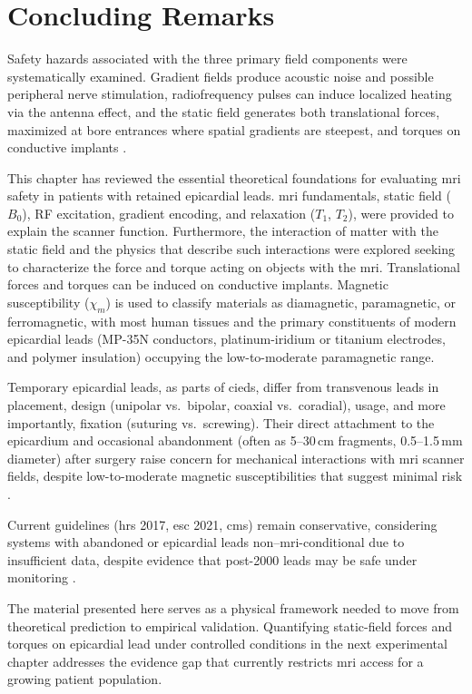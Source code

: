 \section{Concluding Remarks}

Safety hazards associated with the three primary field components were systematically examined. Gradient fields produce acoustic noise and possible peripheral nerve stimulation, radiofrequency pulses can induce localized heating via the antenna effect, and the static field generates both translational forces, maximized at bore entrances where spatial gradients are steepest, and torques on conductive implants \cite{Schenck2000,panych2018}.

This chapter has reviewed the essential theoretical foundations for evaluating \gls{mri} safety in patients with retained epicardial leads. \gls{mri} fundamentals, static field ($B_0$), RF excitation, gradient encoding, and relaxation ($T_1$, $T_2$), were provided to explain the scanner function. Furthermore, the interaction of matter with the static field and the physics that describe such interactions were explored seeking to characterize the force and torque acting on objects with the \gls{mri}. Translational forces and torques can be induced on conductive implants. Magnetic susceptibility ($\chi_m$) is used to classify materials as diamagnetic, paramagnetic, or ferromagnetic, with most human tissues and the primary constituents of modern epicardial leads (MP-35N conductors, platinum-iridium or titanium electrodes, and polymer insulation) occupying the low-to-moderate paramagnetic range.

Temporary epicardial leads, as parts of \glspl{cied}, differ from transvenous leads in placement, design (unipolar vs.\ bipolar, coaxial vs.\ coradial), usage, and more importantly, fixation (suturing vs.\ screwing). Their direct attachment to the epicardium and occasional abandonment (often as 5--30\,cm fragments, 0.5--1.5\,mm diameter) after surgery raise concern for mechanical interactions with \gls{mri} scanner fields, despite low-to-moderate magnetic susceptibilities that suggest minimal risk \cite{Schenck2000}.

Current guidelines (\gls{hrs} 2017, \gls{esc} 2021, \gls{cms}) remain conservative, considering systems with abandoned or epicardial leads non--\gls{mri}-conditional due to insufficient data, despite evidence that post-2000 leads may be safe under monitoring \cite{vuorinen2021,schaller2021}. 

The material presented here serves as a physical framework needed to move from theoretical prediction to empirical validation. Quantifying static-field forces and torques on epicardial lead under controlled conditions in the next experimental chapter addresses the evidence gap that currently restricts \gls{mri} access for a growing patient population.
%
